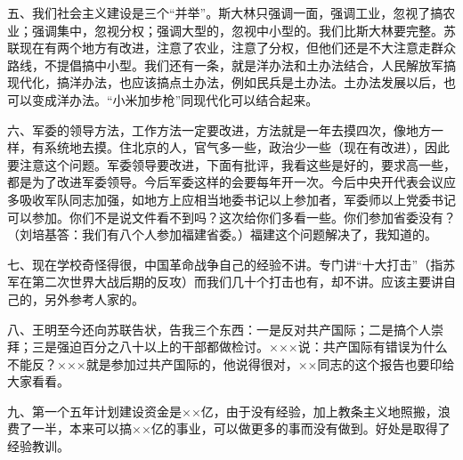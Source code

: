 五、我们社会主义建设是三个“并举”。斯大林只强调一面，强调工业，忽视了搞农业；强调集中，忽视分权；强调大型的，忽视中小型的。我们比斯大林要完整。苏联现在有两个地方有改进，注意了农业，注意了分权，但他们还是不大注意走群众路线，不提倡搞中小型。我们还有一条，就是洋办法和土办法结合，人民解放军搞现代化，搞洋办法，也应该搞点土办法，例如民兵是土办法。土办法发展以后，也可以变成洋办法。“小米加步枪”同现代化可以结合起来。

六、军委的领导方法，工作方法一定要改进，方法就是一年去摸四次，像地方一样，有系统地去摸。住北京的人，官气多一些，政治少一些（现在有改进），因此要注意这个问题。军委领导要改进，下面有批评，我看这些是好的，要求高一些，都是为了改进军委领导。今后军委这样的会要每年开一次。今后中央开代表会议应多吸收军队同志加强，如地方上应相当地委书记以上参加者，军委师以上党委书记可以参加。你们不是说文件看不到吗？这次给你们多看一些。你们参加省委没有？（刘培基答：我们有八个人参加福建省委。）福建这个问题解决了，我知道的。

七、现在学校奇怪得很，中国革命战争自己的经验不讲。专门讲“十大打击”（指苏军在第二次世界大战后期的反攻）而我们几十个打击也有，却不讲。应该主要讲自己的，另外参考人家的。

八、王明至今还向苏联告状，告我三个东西：一是反对共产国际；二是搞个人崇拜；三是强迫百分之八十以上的干部都做检讨。×××说：共产国际有错误为什么不能反？×××就是参加过共产国际的，他说得很对，××同志的这个报告也要印给大家看看。

九、第一个五年计划建设资金是××亿，由于没有经验，加上教条主义地照搬，浪费了一半，本来可以搞××亿的事业，可以做更多的事而没有做到。好处是取得了经验教训。


